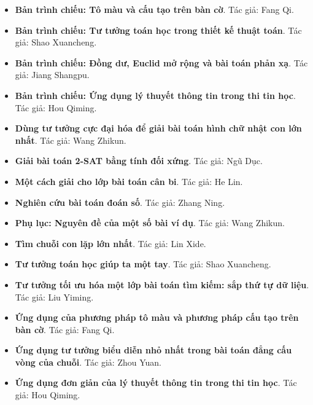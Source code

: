 \documentclass[11pt]{article}
\begin{document}
\begin{itemize}[leftmargin=2em]
  \item \textbf{Bản trình chiếu: Tô màu và cấu tạo trên bàn cờ}. Tác giả: Fang Qi.
  \item \textbf{Bản trình chiếu: Tư tưởng toán học trong thiết kế thuật toán}. Tác giả: Shao Xuancheng.
  \item \textbf{Bản trình chiếu: Đồng dư, Euclid mở rộng và bài toán phản xạ}. Tác giả: Jiang Shangpu.
  \item \textbf{Bản trình chiếu: Ứng dụng lý thuyết thông tin trong thi tin học}. Tác giả: Hou Qiming.
  \item \textbf{Dùng tư tưởng cực đại hóa để giải bài toán hình chữ nhật con lớn nhất}. Tác giả: Wang Zhikun.
  \item \textbf{Giải bài toán 2-SAT bằng tính đối xứng}. Tác giả: Ngũ Dục.
  \item \textbf{Một cách giải cho lớp bài toán cân bi}. Tác giả: He Lin.
  \item \textbf{Nghiên cứu bài toán đoán số}. Tác giả: Zhang Ning.
  \item \textbf{Phụ lục: Nguyên đề của một số bài ví dụ}. Tác giả: Wang Zhikun.
  \item \textbf{Tìm chuỗi con lặp lớn nhất}. Tác giả: Lin Xide.
  \item \textbf{Tư tưởng toán học giúp ta một tay}. Tác giả: Shao Xuancheng.
  \item \textbf{Tư tưởng tối ưu hóa một lớp bài toán tìm kiếm: sắp thứ tự dữ liệu}. Tác giả: Liu Yiming.
  \item \textbf{Ứng dụng của phương pháp tô màu và phương pháp cấu tạo trên bàn cờ}. Tác giả: Fang Qi.
  \item \textbf{Ứng dụng tư tưởng biểu diễn nhỏ nhất trong bài toán đẳng cấu vòng của chuỗi}. Tác giả: Zhou Yuan.
  \item \textbf{Ứng dụng đơn giản của lý thuyết thông tin trong thi tin học}. Tác giả: Hou Qiming.
\end{itemize}
\end{document}
